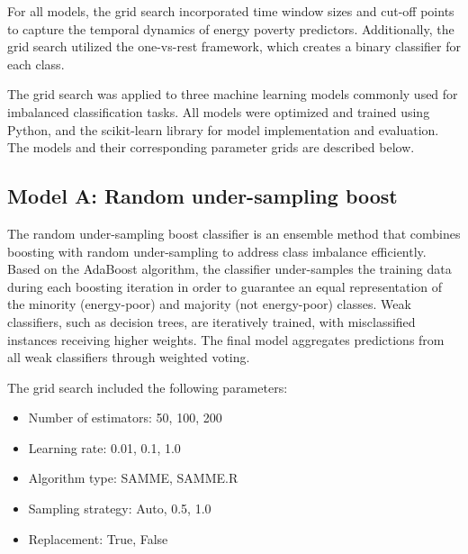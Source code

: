 \documentclass[preprint,authoryear,12pt]{elsarticle}
\begin{document}
For all models, the grid search incorporated time window sizes and cut-off points to capture the temporal dynamics of energy poverty predictors. Additionally, the grid search utilized the one-vs-rest framework, which creates a binary classifier for each class.

The grid search was applied to three machine learning models commonly used for imbalanced classification tasks. All models were optimized and trained using Python, and the scikit-learn library for model implementation and evaluation. The models and their corresponding parameter grids are described below.

\subsection{Model A: Random under-sampling boost}\label{ModelA}

The random under-sampling boost classifier is an ensemble method that combines boosting with random under-sampling to address class imbalance efficiently. Based on the AdaBoost algorithm, the classifier under-samples the training data during each boosting iteration in order to guarantee an equal representation of the minority (energy-poor) and majority (not energy-poor) classes. Weak classifiers, such as decision trees, are iteratively trained, with misclassified instances receiving higher weights. The final model aggregates predictions from all weak classifiers through weighted voting.

The grid search included the following parameters:
\begin{itemize}
\item Number of estimators: 50, 100, 200
\item Learning rate: 0.01, 0.1, 1.0
\item Algorithm type: SAMME, SAMME.R
\item Sampling strategy: Auto, 0.5, 1.0
\item Replacement: True, False
\end{itemize}

\end{document}
